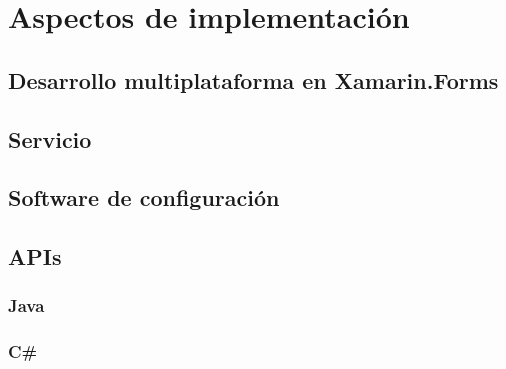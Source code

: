 \section{Aspectos de implementación}

\subsection{Desarrollo multiplataforma en Xamarin.Forms}

\subsection{Servicio}

\subsection{Software de configuración}

\subsection{APIs}
	
	\subsubsection{Java}
	\subsubsection{C\#}
    